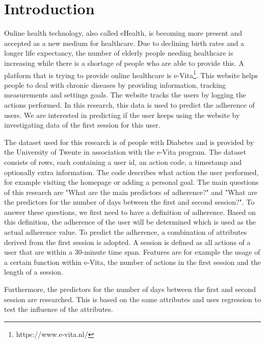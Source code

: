 \section{Introduction}
Online health technology, also called eHealth, is becoming more present and accepted as a new medium for healthcare. Due to declining birth rates and a longer life expectancy, the number of elderly people needing healthcare is increasing while there is a shortage of people who are able to provide this. A platform that is trying to provide online healthcare is e-Vita\footnote{https://www.e-vita.nl/}. This website helps people to deal with chronic diseases by providing information, tracking measurements and settings goals. The website tracks the users by logging the actions performed. In this research, this data is used to predict the adherence of users. We are interested in predicting if the user keeps using the website by investigating data of the first session for this user.

The dataset used for this research is of people with Diabetes and is provided by the University of Twente in association with the e-Vita program. The dataset consists of rows, each containing a user id, an action code, a timestamp and optionally extra information. The code describes what action the user performed, for example visiting the homepage or adding a personal goal. The main questions of this research are "What are the main predictors of adherence?" and "What are the predictors for the number of days between the first and second session?". To answer these questions, we first need to have a definition of adherence. Based on this definition, the adherence of the user will be determined which is used as the actual adherence value. To predict the adherence, a combination of attributes derived from the first session is adopted. A session is defined as all actions of a user that are within a 30-minute time span. Features are for example the usage of a certain function within e-Vita, the number of actions in the first session and the length of a session.

Furthermore, the predictors for the number of days between the first and second session are researched. This is based on the same attributes and uses regression to test the influence of the attributes.